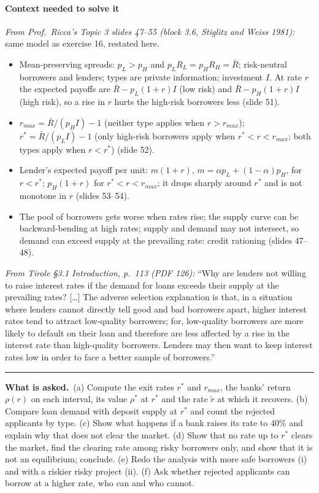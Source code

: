 \documentclass[11pt,a4paper]{article}
\newcommand{\asked}{\par\medskip\noindent\textbf{What is asked.}~}
\providecommand{\tightlist}{\setlength{\itemsep}{0pt}\setlength{\parskip}{0pt}}
\newcommand{\stmtend}{\par\endgroup\nopagebreak\noindent\rule{\linewidth}{0.4pt}\par\medskip}
\begin{document}
\paragraph{Context needed to solve it}

\emph{From Prof.~Ricca's Topic 3 slides 47--55 (block 3.6, Stiglitz and Weiss 1981):} same model as
exercise 16, restated here.

\begin{itemize}
\tightlist
\item
  Mean-preserving spreads: \(p_L > p_H\) and \(p_L R_L = p_H R_H = \bar R\); risk-neutral borrowers
  and lenders; types are private information; investment \(I\). At rate \(r\) the expected payoffs
  are \(\bar R - p_L(1 + r)I\) (low risk) and \(\bar R - p_H(1 + r)I\) (high risk), so a rise in
  \(r\) hurts the high-risk borrowers less (slide 51).
\item
  \(r_{max} = \bar R/(p_H I) - 1\) (neither type applies when \(r > r_{max}\));
  \(r^* = \bar R/(p_L I) - 1\) (only high-risk borrowers apply when \(r^* < r < r_{max}\); both
  types apply when \(r < r^*\)) (slide 52).
\item
  Lender's expected payoff per unit: \(m(1 + r)\), \(m = \alpha p_L + (1 - \alpha)p_H\), for
  \(r < r^*\); \(p_H(1 + r)\) for \(r^* < r < r_{max}\); it drops sharply around \(r^*\) and is not
  monotone in \(r\) (slides 53--54).
\item
  The pool of borrowers gets worse when rates rise; the supply curve can be backward-bending at high
  rates; supply and demand may not intersect, so demand can exceed supply at the prevailing rate:
  credit rationing (slides 47--48).
\end{itemize}

\emph{From Tirole §3.1 Introduction, p.~113 (PDF 126):} ``Why are lenders not willing to raise
interest rates if the demand for loans exceeds their supply at the prevailing rates? {[}\ldots{]}
The adverse selection explanation is that, in a situation where lenders cannot directly tell good
and bad borrowers apart, higher interest rates tend to attract low-quality borrowers; for,
low-quality borrowers are more likely to default on their loan and therefore are less affected by a
rise in the interest rate than high-quality borrowers. Lenders may then want to keep interest rates
low in order to face a better sample of borrowers.''
\stmtend

\asked (a) Compute the exit rates $r^*$ and $r_{max}$, the banks' return $\rho(r)$ on each interval, its value $\rho^*$ at $r^*$ and the rate $\tilde r$ at which it recovers. (b) Compare loan demand with deposit supply at $r^*$ and count the rejected applicants by type. (c) Show what happens if a bank raises its rate to $40\%$ and explain why that does not clear the market. (d) Show that no rate up to $r^*$ clears the market, find the clearing rate among risky borrowers only, and show that it is not an equilibrium; conclude. (e) Redo the analysis with more safe borrowers (i) and with a riskier risky project (ii). (f) Ask whether rejected applicants can borrow at a higher rate, who can and who cannot.
\end{document}
